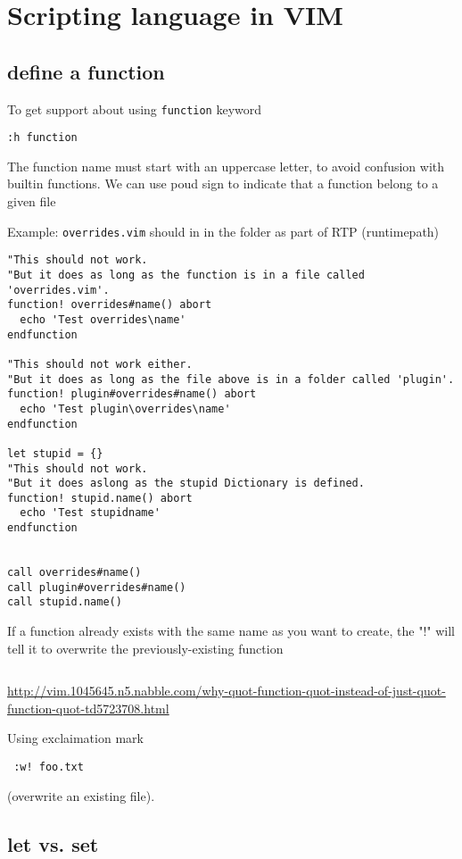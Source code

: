 \section{Scripting language in VIM}
\label{sec:vim-scripting-language}

\subsection{define a function}

To get support about using \verb!function! keyword
\begin{verbatim}
:h function
\end{verbatim}

The function name must start with an uppercase letter, to avoid confusion with
builtin functions. We can use poud sign to indicate that a function belong to a
given file

Example: \verb!overrides.vim! should in in the folder as part of RTP
(runtimepath)
\begin{verbatim}
"This should not work.
"But it does as long as the function is in a file called 'overrides.vim'.
function! overrides#name() abort
  echo 'Test overrides\name'
endfunction

"This should not work either.
"But it does as long as the file above is in a folder called 'plugin'.
function! plugin#overrides#name() abort 
  echo 'Test plugin\overrides\name'
endfunction

let stupid = {}
"This should not work.
"But it does aslong as the stupid Dictionary is defined.
function! stupid.name() abort
  echo 'Test stupidname'
endfunction


call overrides#name()
call plugin#overrides#name()
call stupid.name()
\end{verbatim}

If a function already exists with the same name as you want to 
create, the "!" will tell it to overwrite the previously-existing 
function
\begin{verbatim}

\end{verbatim}
\url{http://vim.1045645.n5.nabble.com/why-quot-function-quot-instead-of-just-quot-function-quot-td5723708.html}

Using exclaimation mark 
\begin{verbatim}
 :w! foo.txt 
\end{verbatim}
(overwrite an existing file).

\subsection{let vs. set}
\label{sec:vim-script-let}
\label{sec:vim-script-set}
\label{sec:vim-script-variable}
\label{sec:vim-script-option}

